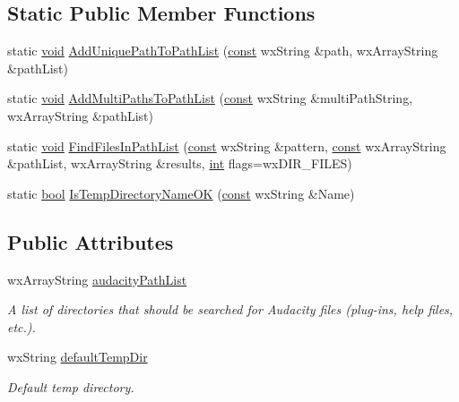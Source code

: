 \subsection*{Static Public Member Functions}
\begin{DoxyCompactItemize}
\item 
static \hyperlink{sound_8c_ae35f5844602719cf66324f4de2a658b3}{void} \hyperlink{class_audacity_app_a051affe029130ea2d5e54460e4bc9f96}{Add\+Unique\+Path\+To\+Path\+List} (\hyperlink{getopt1_8c_a2c212835823e3c54a8ab6d95c652660e}{const} wx\+String \&path, wx\+Array\+String \&path\+List)
\item 
static \hyperlink{sound_8c_ae35f5844602719cf66324f4de2a658b3}{void} \hyperlink{class_audacity_app_a7fa907efc7345693ae4a81efd54149d9}{Add\+Multi\+Paths\+To\+Path\+List} (\hyperlink{getopt1_8c_a2c212835823e3c54a8ab6d95c652660e}{const} wx\+String \&multi\+Path\+String, wx\+Array\+String \&path\+List)
\item 
static \hyperlink{sound_8c_ae35f5844602719cf66324f4de2a658b3}{void} \hyperlink{class_audacity_app_a491bdb4d064ffc5392375e8bdf0442c2}{Find\+Files\+In\+Path\+List} (\hyperlink{getopt1_8c_a2c212835823e3c54a8ab6d95c652660e}{const} wx\+String \&pattern, \hyperlink{getopt1_8c_a2c212835823e3c54a8ab6d95c652660e}{const} wx\+Array\+String \&path\+List, wx\+Array\+String \&results, \hyperlink{xmltok_8h_a5a0d4a5641ce434f1d23533f2b2e6653}{int} flags=wx\+D\+I\+R\+\_\+\+F\+I\+L\+ES)
\item 
static \hyperlink{mac_2config_2i386_2lib-src_2libsoxr_2soxr-config_8h_abb452686968e48b67397da5f97445f5b}{bool} \hyperlink{class_audacity_app_a551a639cc462558c0e1f24fd1ac7b0ae}{Is\+Temp\+Directory\+Name\+OK} (\hyperlink{getopt1_8c_a2c212835823e3c54a8ab6d95c652660e}{const} wx\+String \&Name)
\end{DoxyCompactItemize}
\subsection*{Public Attributes}
\begin{DoxyCompactItemize}
\item 
wx\+Array\+String \hyperlink{class_audacity_app_a04d9d13de407ee9c61e9e74c8bdd9d38}{audacity\+Path\+List}
\begin{DoxyCompactList}\small\item\em A list of directories that should be searched for Audacity files (plug-\/ins, help files, etc.). \end{DoxyCompactList}\item 
wx\+String \hyperlink{class_audacity_app_a841018e439ee4c150680676585e71a1b}{default\+Temp\+Dir}
\begin{DoxyCompactList}\small\item\em Default temp directory. \end{DoxyCompactList}\end{DoxyCompactItemize}
